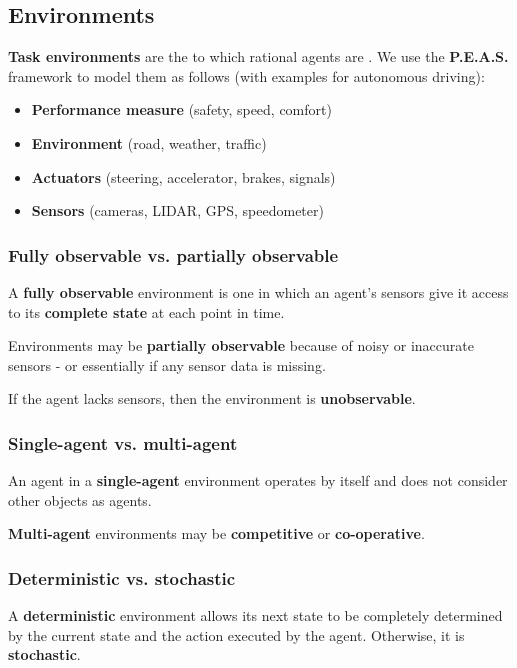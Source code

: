 \subsection{Environments}

\textbf{Task environments} are the  to which rational agents are . We use the \textbf{P.E.A.S.} framework to model them as follows (with examples for autonomous driving):

\begin{itemize}
    \item \textbf{Performance measure} (safety, speed, comfort)
    \item \textbf{Environment} (road, weather, traffic)
    \item \textbf{Actuators} (steering, accelerator, brakes, signals)
    \item \textbf{Sensors} (cameras, LIDAR, GPS, speedometer)
\end{itemize}


\subsubsection{Fully observable vs. partially observable}

A \textbf{fully observable} environment is one in which an agent's sensors give it access to its \textbf{complete state} at each point in time.

Environments may be \textbf{partially observable} because of noisy or inaccurate sensors - or essentially if any sensor data is missing.

If the agent lacks sensors, then the environment is \textbf{unobservable}.


\subsubsection{Single-agent vs. multi-agent}

An agent in a \textbf{single-agent} environment operates by itself and does not consider other objects as agents.

\textbf{Multi-agent} environments may be \textbf{competitive} or \textbf{co-operative}.


\subsubsection{Deterministic vs. stochastic}

A \textbf{deterministic} environment allows its next state to be completely determined by the current state and the action executed by the agent. Otherwise, it is \textbf{stochastic}.

